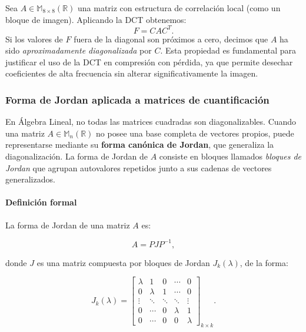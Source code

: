 \documentclass[8pt,a4paper]{article}
\theoremstyle{definition}
\theoremstyle{remark}
\begin{document}
\begin{multicols}{2}
            Sea \( A \in \mathbb{M}_{8 \times 8}(\mathbb{R}) \) una matriz con estructura de correlación local (como un bloque de imagen). Aplicando la DCT obtenemos:
            \[
            F = C A C^T.
            \]
            Si los valores de \( F \) fuera de la diagonal son próximos a cero, decimos que \( A \) ha sido \textit{aproximadamente diagonalizada} por \( C \). Esta propiedad es fundamental para justificar el uso de la DCT en compresión con pérdida, ya que permite desechar coeficientes de alta frecuencia sin alterar significativamente la imagen.

            \subsubsection{Forma de Jordan aplicada a matrices de cuantificación}

            En Álgebra Lineal, no todas las matrices cuadradas son diagonalizables. Cuando una matriz \( A \in \mathbb{M}_n(\mathbb{R}) \) no posee una base completa de vectores propios, puede representarse mediante su \textbf{forma canónica de Jordan}, que generaliza la diagonalización. La forma de Jordan de \( A \) consiste en bloques llamados \textit{bloques de Jordan} que agrupan autovalores repetidos junto a sus cadenas de vectores generalizados.
            
            \paragraph{Definición formal}
            
            La forma de Jordan de una matriz \( A \) es:
            
            \[
            A = P J P^{-1},
            \]
            
            donde \( J \) es una matriz compuesta por bloques de Jordan \( J_k(\lambda) \), de la forma:
            
            \[
            J_k(\lambda) =
            \begin{bmatrix}
            \lambda & 1      & 0      & \cdots & 0 \\
            0       & \lambda & 1      & \cdots & 0 \\
            \vdots  & \ddots & \ddots & \ddots & \vdots \\
            0       & \cdots & 0      & \lambda & 1 \\
            0       & \cdots & 0      & 0      & \lambda
            \end{bmatrix}_{k \times k}.
            \]
            

\end{multicols}
\end{document}
